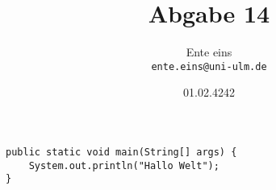 \documentclass{article} %
\begin{document}
\title{Abgabe 14}
\author{Ente eins\\\texttt{ente.eins@uni-ulm.de}}
\date{01.02.4242}

\maketitle

\begin{lstlisting}
public static void main(String[] args) {
    System.out.println("Hallo Welt");   
}
\end{lstlisting}
\end{document}
